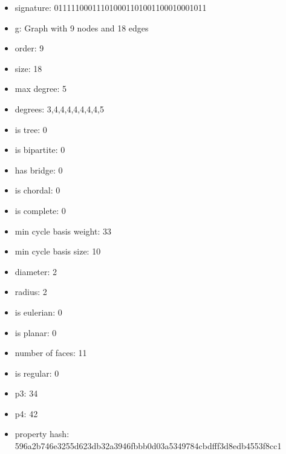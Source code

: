 \newpage
\begin{figure}
\end{figure}
\begin{itemize}
\item signature: 011111000111010001101001100010001011
\item g: Graph with 9 nodes and 18 edges
\item order: 9
\item size: 18
\item max degree: 5
\item degrees: 3,4,4,4,4,4,4,4,5
\item is tree: 0
\item is bipartite: 0
\item has bridge: 0
\item is chordal: 0
\item is complete: 0
\item min cycle basis weight: 33
\item min cycle basis size: 10
\item diameter: 2
\item radius: 2
\item is eulerian: 0
\item is planar: 0
\item number of faces: 11
\item is regular: 0
\item p3: 34
\item p4: 42
\item property hash: 596a2b746e3255d623db32a3946fbbb0d03a5349784cbdfff3d8edb4553f8cc1
\end{itemize}
